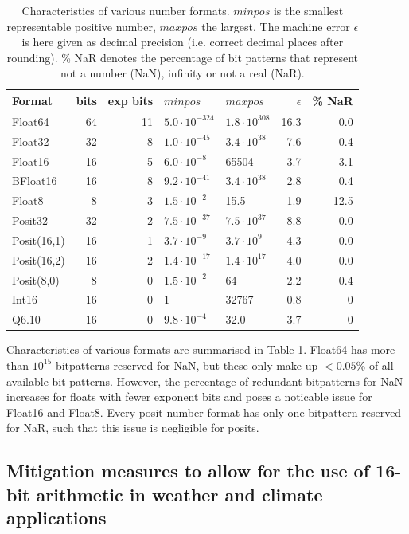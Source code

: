 \documentclass[draft]{agujournal2019}
\begin{document}
\begin{table}[htbp]
\center
\begin{tabular}{l | r | r | l | l | r | r}
Format & bits & exp bits & $minpos$ & $maxpos$ & $\epsilon$ &  \% NaR \\
\hline
Float64	& 64 & 11 & $5.0 \cdot 10^{-324}$ & $1.8 \cdot 10^{308}$  & 16.3 & 0.0 \\
Float32	& 32 & 8 & $1.0 \cdot 10^{-45}$ & $3.4 \cdot 10^{38}$ & 7.6 & 0.4 \\
Float16	& 16 & 5 & $6.0 \cdot 10^{-8}$ & 65504 & 3.7 & 3.1 \\
BFloat16	& 16 & 8 & $ 9.2 \cdot 10^{-41}$ & $3.4 \cdot 10^{38}$ & 2.8 & 0.4  \\
Float8 & 8 & 3 & $1.5 \cdot 10^{-2}$ & 15.5 & 1.9 &12.5\\
\hline
Posit32	& 32 & 2 &  $7.5 \cdot 10^{-37}$ & $7.5 \cdot 10^{37}$ & 8.8 & 0.0 \\
Posit(16,1) & 16 & 1 & $3.7 \cdot 10^{-9}$ & $3.7 \cdot 10^{9}$ & 4.3 & 0.0\\
Posit(16,2) & 16 & 2 & $1.4 \cdot 10^{-17}$ & $1.4 \cdot 10^{17}$ & 4.0 & 0.0\\
Posit(8,0) & 8 & 0 & $1.5 \cdot 10^{-2}$ & 64 & 2.2 & 0.4  \\
\hline
Int16 & 16 & 0 & 1 & 32767 & 0.8 & 0\\
Q6.10 & 16 & 0 & $9.8 \cdot 10^{-4}$ & 32.0 & 3.7 & 0
\end{tabular}
\vspace{10pt}
\caption{Characteristics of various number formats. $minpos$ is the smallest
representable positive number, $maxpos$ the largest. The machine error $\epsilon$
is here given as decimal precision (i.e. correct decimal places after rounding).
\% NaR denotes the percentage of bit patterns that represent not a number (NaN),
infinity or not a real (NaR).}
\label{tab:formats}
\end{table}

Characteristics of various formats are summarised in Table \ref{tab:formats}.
Float64 has more than $10^{15}$ bitpatterns reserved for NaN, but these only
make up $< 0.05\%$ of all available bit patterns. However, the percentage of
redundant bitpatterns for NaN increases for floats with fewer exponent bits
and poses a noticable issue for Float16 and Float8. Every posit number format
has only one bitpattern reserved for NaR, such that this issue is negligible for
posits.

\subsection{Mitigation measures to allow for the use of 16-bit arithmetic in
weather and climate applications}
\end{document}
